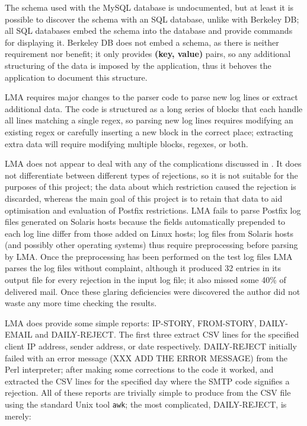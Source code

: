 The schema used with the MySQL database is undocumented, but at least it is
possible to discover the schema with an \gls{SQL} database, unlike with
Berkeley DB\@; all \gls{SQL} databases embed the schema into the database
and provide commands for displaying it.  Berkeley DB does not embed a
schema, as there is neither requirement nor benefit; it only provides
\textbf{(key, value)} pairs, so any additional structuring of the data is
imposed by the application, thus it behoves the application to document
this structure.

\gls{LMA} requires major changes to the parser code to parse new log lines
or extract additional data.  The code is structured as a long series of
blocks that each handle all lines matching a single regex, so parsing new
log lines requires modifying an existing regex or carefully inserting a new
block in the correct place; extracting extra data will require modifying
multiple blocks, regexes, or both.

\gls{LMA} does not appear to deal with any of the complications discussed
in .  It does not differentiate between different
types of rejections, so it is not suitable for the purposes of this
project; the data about which restriction caused the rejection is
discarded, whereas the main goal of this project is to retain that data to
aid optimisation and evaluation of Postfix restrictions.  \gls{LMA} fails
to parse Postfix log files generated on Solaris hosts because the fields
automatically prepended to each log line differ from those added on Linux
hosts; log files from Solaris hosts (and possibly other operating systems)
thus require preprocessing before parsing by \gls{LMA}.  Once the
preprocessing has been performed on the \numberOFlogFILES{} test log files
\gls{LMA} parses the log files without complaint, although it produced 32
entries in its output file for every rejection in the input log file; it
also missed some 40\% of delivered mail.  Once these glaring deficiencies
were discovered the author did not waste any more time checking the
results.

\gls{LMA} does provide some simple reports: IP-STORY, FROM-STORY,
DAILY-EMAIL and DAILY-REJECT\@.  The first three extract \gls{CSV} lines
for the specified client \gls{IP} address, sender address, or date
respectively.  DAILY-REJECT initially failed with an error message (XXX ADD
THE ERROR MESSAGE) from the Perl interpreter; after making some corrections
to the code it worked, and extracted the \gls{CSV} lines for the specified
day where the \gls{SMTP} code signifies a rejection.  All of these reports
are trivially simple to produce from the \gls{CSV} file using the standard
Unix tool \texttt{awk}; the most complicated, DAILY-REJECT, is
merely:

